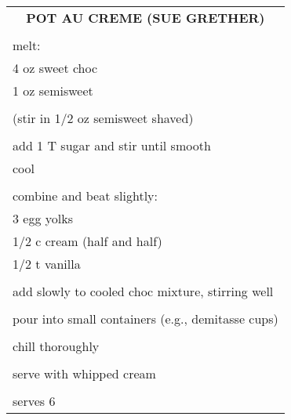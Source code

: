 \documentclass[8pt]{report}
\begin{document}
\begin{tabular}{|l|} \hline	%
 
\multicolumn{1}{|c|}{\textbf{POT AU CREME (SUE GRETHER)}}
\\
\\

\index{desserts!pot au creme (sue grether)} \index{pot au
creme}\index{chocolate!pot au creme}

melt:\\
\hspace{0.5 in}	4 oz sweet choc\\
\hspace{0.5 in}	1 oz semisweet\\
\\
(stir in 1/2 oz semisweet shaved)\\
\\
add 1 T sugar and stir until smooth\\
cool\\
\\
combine and beat slightly:\\
\hspace{0.5 in}	3 egg yolks\\
\hspace{0.5 in}	1/2 c cream (half and half)\\
\hspace{0.5 in}	1/2 t vanilla\\
\\
add slowly to cooled choc mixture, stirring well\\
\\
pour into small containers (e.g., demitasse cups)\\
\\
chill thoroughly\\
\\
serve with whipped cream\\
\\
serves 6\\



\hline

\end{tabular}

\newpage

\centering
\end{document}
